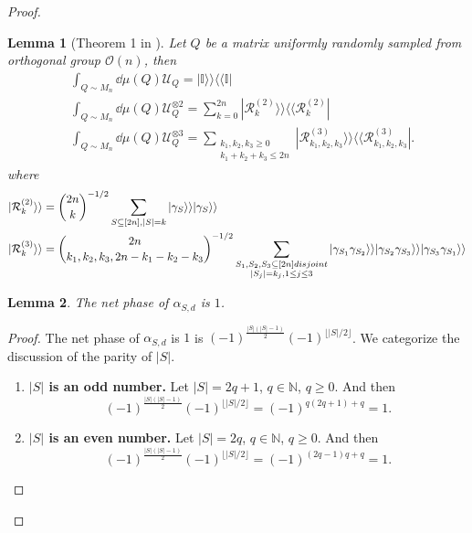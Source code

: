 \documentclass{article}
\newtheorem{lemma}{Lemma}
\newcommand{\supket}[1]{|#1 \rangle\rangle}
\newcommand{\supbra}[1]{\langle\langle #1 |}
\newcommand{\floor}[1]{\lfloor #1 \rfloor}
\begin{document}
\begin{proof}
\begin{lemma}[Theorem 1 in \cite{wan2022matchgate}]
    Let $Q$ be a matrix uniformly randomly sampled from orthogonal group $\mathcal{O}(n)$, then
\begin{align}
& \int_{Q\sim M_n} \dd\mu(Q) \mathcal{U}_Q = \supket{\mathbb{I}}\supbra{\mathbb{I}}\\
& \int_{Q\sim M_n} \dd\mu(Q)\mathcal{U}_Q^{\otimes 2} = \sum_{k=0}^{2n}\supket{\mathcal{R}_k^{(2)}}\supbra{\mathcal{R}_k^{(2)}}\\
& \int_{Q\sim M_n} \dd\mu(Q)\mathcal{U}_Q^{\otimes 3} = \sum_{
\substack{
k_1,k_2,k_3\geq 0\\
k_1 + k_2 + k_3\leq 2n
}
}\supket{\mathcal{R}_{k_1,k_2,k_3}^{(3)}}\supbra{\mathcal{R}_{k_1,k_2,k_3}^{(3)}}.
\end{align}
where
\begin{align}
    &\supket{\mathcal{R}_k^{(2)}} = { 2n\choose k}^{-1/2} \sum_{S\subseteq [2n],|S|=k}\supket{\gamma_S}\supket{\gamma_S}\\
    &\supket{\mathcal{R}_k^{(3)}} = {2n \choose k_1,k_2,k_3,2n-k_1-k_2-k_3}^{-1/2} \sum_{
    \substack{
 S_1, S_2, S_3\subseteq [2n] disjoint\\
 \abs{S_j}=k_j,1\leq j\leq 3
    }
    } \supket{\gamma_{S_1}\gamma_{S_2}}
    \supket{\gamma_{S_2}\gamma_{S_3}}
    \supket{\gamma_{S_3}\gamma_{S_1}}
\label{eq:third_moment}
\end{align}
\label{lem:threemomentsMatchgate}
\end{lemma}

\begin{lemma}
\label{lemma: The net phase of alpha is 1}
    The net phase of $\alpha_{S,d}$ is $1$.
\end{lemma}
\begin{proof}
    The net phase of $\alpha_{S,d}$ is $1$ is $(-1)^{\frac{|S|(|S|-1)}{2}} (-1)^{\floor{|S|/2}}$. We categorize the discussion of the parity of $|S|$.
    \begin{enumerate}
        \item \textbf{$|S|$ is an odd number.} Let $|S| = 2q+1$, $ q\in \mathbb{N}$, $q\geq 0$. And then
        \begin{equation}
            (-1)^{\frac{|S|(|S|-1)}{2}} (-1)^{\floor{|S|/2}} = (-1)^{q(2q+1)+q} = 1.
        \end{equation}
        \item \textbf{$|S|$ is an even number.} Let $|S| = 2q$, $ q\in \mathbb{N}$, $q\geq 0$. And then
        \begin{equation}
            (-1)^{\frac{|S|(|S|-1)}{2}} (-1)^{\floor{|S|/2}} = (-1)^{(2q-1)q+q} = 1.
        \end{equation}
    \end{enumerate}
\end{proof}


\end{proof}
\end{document}

